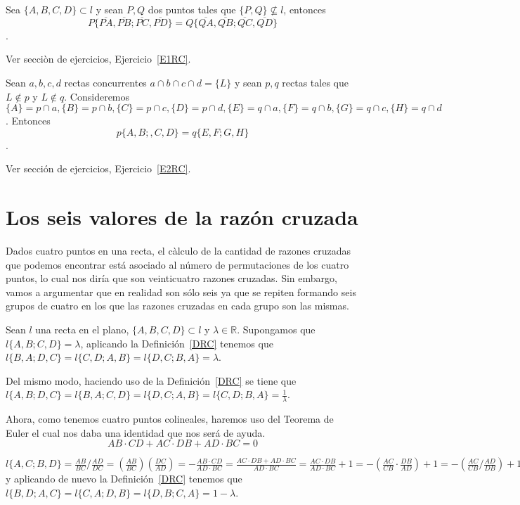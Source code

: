 \begin{cor}\label{C1RC}
Sea $\{A,B,C,D\}\subset l$ y sean $P,Q$ dos puntos tales que $\{P,Q\}\nsubseteq l$, entonces $$P\{\overline{PA},\overline{PB};\overline{PC},\overline{PD}\}=Q\{\overline{QA},\overline{QB};\overline{QC},\overline{QD}\}$$.
\end{cor}
\begin{pba}
Ver secciòn de ejercicios, Ejercicio~\ref{E1RC}.
\end{pba}

\begin{cor}\label{C2RC}
Sean $a,b,c,d$ rectas concurrentes $a\cap b\cap c\cap d=\{L\}$ y sean $p,q$ rectas tales que $L\notin p$ y $L\notin q$. Consideremos $\{A\}=p\cap a, \{B\}=p\cap b, \{C\}=p\cap c, \{D\}=p\cap d, \{E\}=q\cap a, \{F\}=q\cap b, \{G\}=q\cap c, \{H\}=q\cap d$.  Entonces
$$p\{A,B;,C,D\}=q\{E,F;G,H\}$$.
\end{cor}
\begin{pba}
Ver sección de ejercicios, Ejercicio~\ref{E2RC}.
\end{pba}

\section{Los seis valores de la razón cruzada}
Dados cuatro puntos en una recta, el càlculo de la cantidad de razones cruzadas que podemos encontrar está asociado al número de permutaciones de los cuatro puntos, lo cual nos diría que son veinticuatro razones cruzadas. Sin embargo, vamos a argumentar que en realidad son sólo seis ya que se repiten formando seis grupos de cuatro  en los que las razones cruzadas en cada grupo son las mismas.

Sean $l$ una recta en el plano, $\{A,B,C,D\}\subset l$ y $\lambda\in\mathbb{R}$.
Supongamos que $l\{A,B;C,D\}=\lambda$, aplicando la Definición~\ref{DRC} tenemos que $l\{B,A;D,C\}=l\{C,D;A,B\}=l\{D,C;B,A\}=\lambda$. 

Del mismo modo, haciendo uso de la Definición~\ref{DRC} se tiene que $l\{A,B;D,C\}=l\{B,A;C,D\}=l\{D,C;A,B\}=l\{C,D;B,A\}=\frac{1}{\lambda}$.

Ahora, como tenemos cuatro puntos colineales, haremos uso del Teorema de Euler el cual nos daba una identidad que nos será de ayuda. 
$$AB\cdot CD+AC\cdot DB+AD\cdot BC=0$$

$l\{A,C;B,D\}=\frac{AB}{BC}\Big/\frac{AD}{DC}=\left(\frac{AB}{BC}\right)\left(\frac{DC}{AD}\right)=-\frac{AB\cdot CD}{AD\cdot BC}=\frac{AC\cdot DB+AD\cdot BC}{AD\cdot BC}=\frac{AC\cdot DB}{AD\cdot BC}+1=-\left(\frac{AC}{CB}\cdot\frac{DB}{AD}\right)+1=-\left(\frac{AC}{CB}\Big/\frac{AD}{DB}\right)+1=-(l\{A,B;C,D\})+1=-(\lambda)+1=1-\lambda$ y aplicando de nuevo la Definición~\ref{DRC} tenemos que $l\{B,D;A,C\}=l\{C,A;D,B\}=l\{D,B;C,A\}=1-\lambda$.

